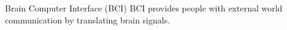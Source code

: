 \documentclass[aspectratio=169]{beamer}
\let\oldcite\cite %
\renewcommand{\cite}[1]{{\tiny\oldcite{#1}}}
\begin{document}
\begin{frame}{Brain Computer Interface (BCI)}
    \centering
    BCI provides people with external world communication by translating brain signals.~\cite{khan2020review}
    \begin{figure}[!ht]
        \centering
    \end{figure}

\end{frame}
\end{document}
